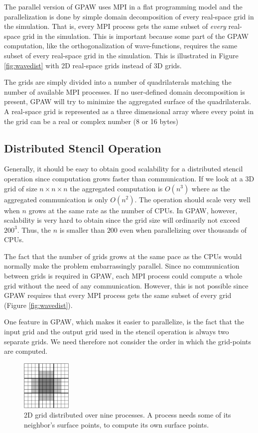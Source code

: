 \documentclass[preprint,3p,times,twocolumn]{elsarticle}
\begin{document}
The parallel version of GPAW uses MPI in a flat programming model and the parallelization is done by simple domain decomposition of every real-space grid in the simulation. That is, every MPI process gets the same subset of \emph{every} real-space grid in the simulation. This is important because some part of the GPAW computation, like the orthogonalization of wave-functions, requires the same subset of every real-space grid in the simulation. This is illustrated in Figure \ref{fig:wavedist} with 2D real-space grids instead of 3D grids.

The grids are simply divided into a number of quadrilaterals matching the number of available MPI processes. If no user-defined domain decomposition is present, GPAW will try to minimize the aggregated surface of the quadrilaterals. A real-space grid is represented as a three dimensional array where every point in the grid can be a real or complex number (8 or 16 bytes)

\subsection{Distributed Stencil Operation}
Generally, it should be easy to obtain good scalability for a distributed stencil operation since computation grows faster than communication. If we look at a 3D grid of size $n \times n \times n$ the aggregated computation is $O\left(n^3\right)$ where as the aggregated communication is only $O\left(n^2\right)$. The operation should scale very well when $n$ grows at the same rate as the number of CPUs. In GPAW, however, scalability is very hard to obtain since the grid size will ordinarily not exceed $200^3$. Thus, the $n$ is smaller than $200$ even when parallelizing over thousands of CPUs.

The fact that the number of grids grows at the same pace as the CPUs would normally make the problem embarrassingly parallel. Since no communication between grids is required in GPAW, each MPI process could compute a whole grid without the need of any communication. However, this is not possible since GPAW requires that every MPI process gets the same subset of every grid (Figure \ref{fig:wavedist}).

One feature in GPAW, which makes it easier to parallelize, is the fact that the input grid and the output grid used in the stencil operation is always two separate grids. We need therefore not consider the order in which the grid-points are computed.

\begin{figure}
 \centering
 \includegraphics[width=90px]{gfx/diststencil}
 \caption{2D grid distributed over nine processes. A process needs some of its neighbor's surface points, to compute its own surface points.}
 \label{fig:diststencil}
\end{figure}
\end{document}

